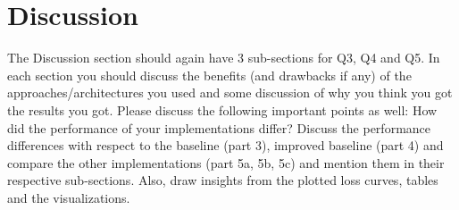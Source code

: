 \section*{Discussion}
The Discussion section should again have 3 sub-sections for Q3, Q4 and Q5. In each section you should discuss the benefits (and drawbacks if any) of the approaches/architectures you used and some discussion of why you think you got the results you got.
Please discuss the following important points as well: How did the performance of your implementations differ? Discuss the performance differences with respect to the baseline (part 3), improved baseline (part 4) and compare the other implementations (part 5a, 5b, 5c) and mention them in their respective sub-sections. Also, draw insights from the plotted loss curves, tables and the visualizations.
